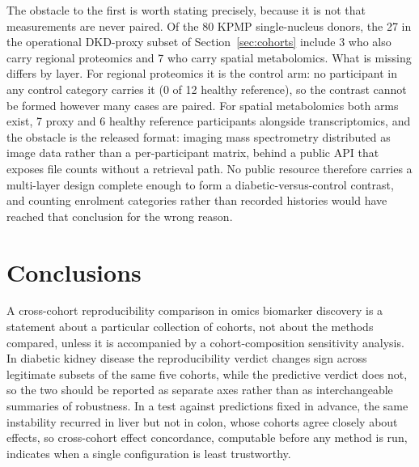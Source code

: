 \documentclass[pdflatex,sn-vancouver-num]{sn-jnl}
\theoremstyle{thmstyleone}
\theoremstyle{thmstyletwo}
\theoremstyle{thmstylethree}
\begin{document}
The obstacle to the first is worth stating precisely, because it is not that measurements are never paired. Of the 80 KPMP single-nucleus donors, the 27 in the operational DKD-proxy subset of Section~\ref{sec:cohorts} include 3 who also carry regional proteomics and 7 who carry spatial metabolomics. What is missing differs by layer. For regional proteomics it is the control arm: no participant in any control category carries it (0 of 12 healthy reference), so the contrast cannot be formed however many cases are paired. For spatial metabolomics both arms exist, 7 proxy and 6 healthy reference participants alongside transcriptomics, and the obstacle is the released format: imaging mass spectrometry distributed as image data rather than a per-participant matrix, behind a public API that exposes file counts without a retrieval path. No public resource therefore carries a multi-layer design complete enough to form a diabetic-versus-control contrast, and counting enrolment categories rather than recorded histories would have reached that conclusion for the wrong reason.

\section{Conclusions}\label{sec:conclusions}

A cross-cohort reproducibility comparison in omics biomarker discovery is a statement about a
particular collection of cohorts, not about the methods compared, unless it is accompanied by a
cohort-composition sensitivity analysis. In diabetic kidney disease the reproducibility verdict
changes sign across legitimate subsets of the same five cohorts, while the predictive verdict
does not, so the two should be reported as separate axes rather than as interchangeable summaries
of robustness. In a test against predictions fixed in advance, the same instability recurred in
liver but not in colon, whose cohorts agree closely about effects, so cross-cohort effect
concordance, computable before any method is run, indicates when a single configuration is least
trustworthy.
\end{document}
